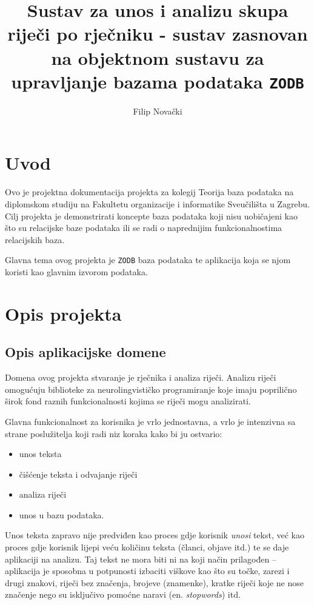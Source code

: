 \documentclass{foi}
\title{Sustav za unos i analizu skupa riječi po rječniku - sustav zasnovan na
objektnom sustavu za upravljanje bazama podataka \texttt{ZODB}}
\author{Filip Novački}
\begin{document}
\nocite{*}

\maketitle
\tableofcontents

\chapter{Uvod}

Ovo je projektna dokumentacija projekta za kolegij Teorija baza podataka na
diplomskom studiju na Fakultetu organizacije i informatike Sveučilišta u
Zagrebu. Cilj projekta je demonstrirati koncepte baza podataka koji nisu
uobičajeni kao što su relacijske baze podataka ili se radi o naprednijim
funkcionalnostima relacijskih baza.

Glavna tema ovog projekta je \texttt{ZODB} baza podataka te aplikacija koja se
njom koristi kao glavnim izvorom podataka.

\chapter{Opis projekta}

\section{Opis aplikacijske domene}

Domena ovog projekta stvaranje je rječnika i analiza riječi. Analizu riječi
omogućuju biblioteke za neurolingvističko programiranje koje imaju poprilično
širok fond raznih funkcionalnosti kojima se riječi mogu analizirati.

Glavna funkcionalnost za korisnika je vrlo jednostavna, a vrlo je intenzivna sa
strane poslužitelja koji radi niz koraka kako bi ju ostvario:
\begin{itemize}
	\item unos teksta
	\item čišćenje teksta i odvajanje riječi
	\item analiza riječi
	\item unos u bazu podataka.
\end{itemize}

Unos teksta zapravo nije predviđen kao proces gdje korisnik \textit{unosi}
tekst, već kao proces gdje korisnik lijepi veću količinu teksta (članci, objave
itd.) te se daje aplikaciji na analizu. Taj tekst ne mora biti ni na koji način
prilagođen -- aplikacija je sposobna u potpunosti izbaciti viškove kao što su
točke, zarezi i drugi znakovi, riječi bez značenja, brojeve (znamenke), kratke
riječi koje ne nose značenje nego su isključivo pomoćne naravi (en.
\textit{stopwords}) itd.
\end{document}
